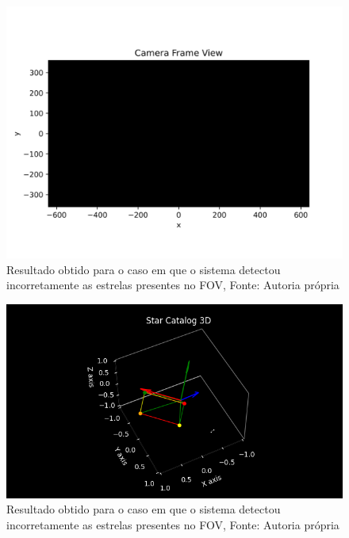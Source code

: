 \begin{figure}[H]
    \centering
    \includegraphics[width=1\textwidth]{images/errou_2D.png}
    \caption{Resultado obtido para o caso em que o sistema detectou incorretamente as estrelas presentes no FOV, Fonte: Autoria própria}
    \label{fig:errou_2D}
\end{figure}

\begin{figure}[H]
    \centering
    \includegraphics[width=1\textwidth]{images/errou_3D.png}
    \caption{Resultado obtido para o caso em que o sistema detectou incorretamente as estrelas presentes no FOV, Fonte: Autoria própria}
    \label{fig:errou_3D}
\end{figure}

